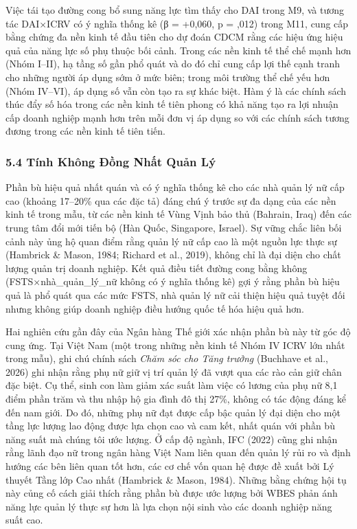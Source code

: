 \documentclass[12pt,a4paper]{article}
\begin{document}
Việc tái tạo đường cong bổ sung năng lực tìm thấy cho DAI trong M9, và
tương tác DAI×ICRV có ý nghĩa thống kê (β = +0,060, p = ,012) trong M11,
cung cấp bằng chứng đa nền kinh tế đầu tiên cho dự đoán CDCM rằng các
hiệu ứng hiệu quả của năng lực số phụ thuộc bối cảnh. Trong các nền kinh
tế thể chế mạnh hơn (Nhóm I--II), hạ tầng số gần phổ quát và do đó chỉ
cung cấp lợi thế cạnh tranh cho những người áp dụng sớm ở mức biên;
trong môi trường thể chế yếu hơn (Nhóm IV--VI), áp dụng số vẫn còn tạo
ra sự khác biệt. Hàm ý là các chính sách thúc đẩy số hóa trong các nền
kinh tế tiên phong có khả năng tạo ra lợi nhuận cấp doanh nghiệp mạnh
hơn trên mỗi đơn vị áp dụng so với các chính sách tương đương trong các
nền kinh tế tiên tiến.

\hypertarget{54-tuxednh-khuxf4ng-ux111ux1ed3ng-nhux1ea5t-quux1ea3n-luxfd}{%
\subsubsection{5.4 Tính Không Đồng Nhất Quản
Lý}\label{54-tuxednh-khuxf4ng-ux111ux1ed3ng-nhux1ea5t-quux1ea3n-luxfd}}

Phần bù hiệu quả nhất quán và có ý nghĩa thống kê cho các nhà quản lý nữ
cấp cao (khoảng 17--20\% qua các đặc tả) đáng chú ý trước sự đa dạng của
các nền kinh tế trong mẫu, từ các nền kinh tế Vùng Vịnh bảo thủ
(Bahrain, Iraq) đến các trung tâm đổi mới tiến bộ (Hàn Quốc, Singapore,
Israel). Sự vững chắc liên bối cảnh này ủng hộ quan điểm rằng quản lý nữ
cấp cao là một nguồn lực thực sự (Hambrick \& Mason, 1984; Richard et
al., 2019), không chỉ là đại diện cho chất lượng quản trị doanh nghiệp.
Kết quả điều tiết đường cong bằng không (FSTS×nhà\_quản\_lý\_nữ không có
ý nghĩa thống kê) gợi ý rằng phần bù hiệu quả là phổ quát qua các mức
FSTS, nhà quản lý nữ cải thiện hiệu quả tuyệt đối nhưng không giúp doanh
nghiệp điều hướng quốc tế hóa hiệu quả hơn.

Hai nghiên cứu gần đây của Ngân hàng Thế giới xác nhận phần bù này từ
góc độ cung ứng. Tại Việt Nam (một trong những nền kinh tế Nhóm IV ICRV
lớn nhất trong mẫu), ghi chú chính sách \emph{Chăm sóc cho Tăng trưởng}
(Buchhave et al., 2026) ghi nhận rằng phụ nữ giữ vị trí quản lý đã vượt
qua các rào cản giữ chân đặc biệt. Cụ thể, sinh con làm giảm xác suất
làm việc có lương của phụ nữ 8,1 điểm phần trăm và thu nhập hộ gia đình
đô thị 27\%, không có tác động đáng kể đến nam giới. Do đó, những phụ nữ
đạt được cấp bậc quản lý đại diện cho một tầng lực lượng lao động được
lựa chọn cao và cam kết, nhất quán với phần bù năng suất mà chúng tôi
ước lượng. Ở cấp độ ngành, IFC (2022) cũng ghi nhận rằng lãnh đạo nữ
trong ngân hàng Việt Nam liên quan đến quản lý rủi ro và định hướng các
bên liên quan tốt hơn, các cơ chế vốn quan hệ được đề xuất bởi Lý thuyết
Tầng lớp Cao nhất (Hambrick \& Mason, 1984). Những bằng chứng hội tụ này
củng cố cách giải thích rằng phần bù được ước lượng bởi WBES phản ánh
năng lực quản lý thực sự hơn là lựa chọn nội sinh vào các doanh nghiệp
năng suất cao.
\end{document}
